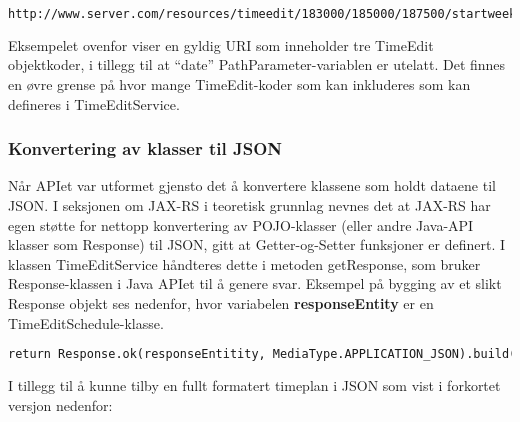 \documentclass[../main.tex]{subfiles}
\begin{document}
\begin{lstlisting}[language=HTML, frame=single, caption={Fungerende eksempel på en URI i APIet.}]
http://www.server.com/resources/timeedit/183000/185000/187500/startweek/1301/stopweek/1315
\end{lstlisting}

Eksempelet ovenfor viser en gyldig URI som inneholder tre TimeEdit objektkoder, i tillegg til at “date” PathParameter-variablen er utelatt. Det finnes en øvre grense på hvor mange TimeEdit-koder som kan inkluderes som kan defineres i TimeEditService.\newline

\subsubsection{Konvertering av klasser til JSON}
Når APIet var utformet gjensto det å konvertere klassene som holdt dataene til JSON. I seksjonen om JAX-RS i teoretisk grunnlag nevnes det at JAX-RS har egen støtte for nettopp konvertering av POJO-klasser (eller andre Java-API klasser som Response) til JSON, gitt at Getter-og-Setter funksjoner er definert. I klassen TimeEditService håndteres dette i metoden getResponse, som bruker Response-klassen i Java APIet til å genere svar. Eksempel på bygging av et slikt Response objekt ses nedenfor, hvor variabelen \textbf{responseEntity} er en TimeEditSchedule-klasse.
\begin{lstlisting}[language=HTML, frame=single, caption={Fungerende eksempel på en URI i APIet.}]
return Response.ok(responseEntitity, MediaType.APPLICATION_JSON).build();
\end{lstlisting}

I tillegg til å kunne tilby en fullt formatert timeplan i JSON som vist i forkortet versjon nedenfor:
\end{document}
